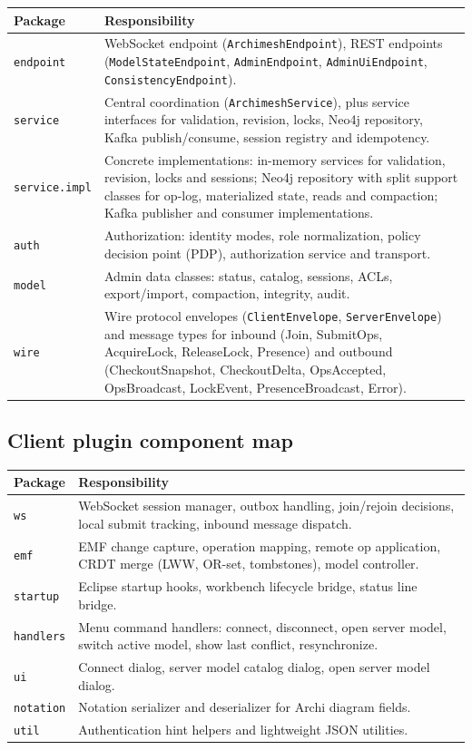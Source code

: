 \begin{longtable}{p{42mm}p{112mm}}
\toprule
Package & Responsibility \\
\midrule
\texttt{endpoint} & WebSocket endpoint (\texttt{ArchimeshEndpoint}), REST
  endpoints (\texttt{ModelStateEndpoint}, \texttt{AdminEndpoint},
  \texttt{AdminUiEndpoint}, \texttt{ConsistencyEndpoint}). \\
\texttt{service} & Central coordination (\texttt{ArchimeshService}), plus
  service interfaces for validation, revision, locks, Neo4j repository,
  Kafka publish/consume, session registry and idempotency. \\
\texttt{service.impl} & Concrete implementations: in-memory services for
  validation, revision, locks and sessions; Neo4j repository with split
  support classes for op-log, materialized state, reads and compaction;
  Kafka publisher and consumer implementations. \\
\texttt{auth} & Authorization: identity modes, role normalization,
  policy decision point (PDP), authorization service and transport. \\
\texttt{model} & Admin data classes: status, catalog, sessions, ACLs,
  export/import, compaction, integrity, audit. \\
\texttt{wire} & Wire protocol envelopes (\texttt{ClientEnvelope},
  \texttt{ServerEnvelope}) and message types for inbound
  (Join, SubmitOps, AcquireLock, ReleaseLock, Presence) and outbound
  (CheckoutSnapshot, CheckoutDelta, OpsAccepted, OpsBroadcast,
  LockEvent, PresenceBroadcast, Error). \\
\bottomrule
\end{longtable}

\subsection{Client plugin component map}

\begin{longtable}{p{42mm}p{112mm}}
\toprule
Package & Responsibility \\
\midrule
\texttt{ws} & WebSocket session manager, outbox handling, join/rejoin
  decisions, local submit tracking, inbound message dispatch. \\
\texttt{emf} & EMF change capture, operation mapping, remote op
  application, CRDT merge (LWW, OR-set, tombstones), model controller. \\
\texttt{startup} & Eclipse startup hooks, workbench lifecycle bridge,
  status line bridge. \\
\texttt{handlers} & Menu command handlers: connect, disconnect, open
  server model, switch active model, show last conflict, resynchronize. \\
\texttt{ui} & Connect dialog, server model catalog dialog, open server
  model dialog. \\
\texttt{notation} & Notation serializer and deserializer for Archi
  diagram fields. \\
\texttt{util} & Authentication hint helpers and lightweight JSON
  utilities. \\
\bottomrule
\end{longtable}

